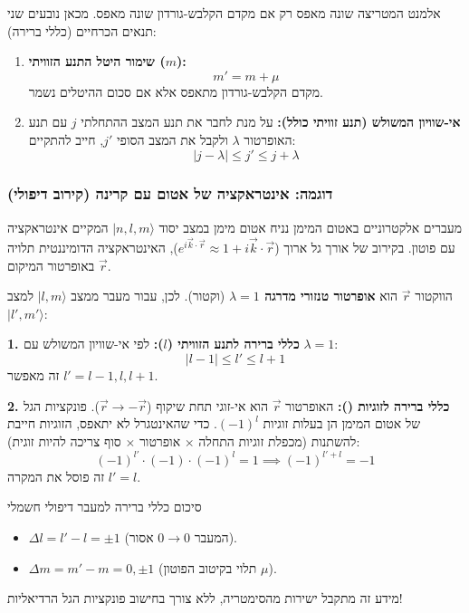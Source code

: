 אלמנט המטריצה שונה מאפס רק אם מקדם הקלבש-גורדון שונה מאפס. מכאן נובעים שני תנאים הכרחיים (כללי ברירה):

\begin{enumerate}
    \item \textbf{שימור היטל התנע הזוויתי ($m$):}
    \[
    m' = m + \mu
    \]
    מקדם הקלבש-גורדון מתאפס אלא אם סכום ההיטלים נשמר.

    \item \textbf{אי-שוויון המשולש (תנע זוויתי כולל):}
    על מנת לחבר את תנע המצב ההתחלתי $j$ עם תנע האופרטור $\lambda$ ולקבל את המצב הסופי $j'$, חייב להתקיים:
    \[
    |j - \lambda| \le j' \le j + \lambda
    \]
\end{enumerate}

\subsubsection{דוגמה: אינטראקציה של אטום עם קרינה (קירוב דיפולי)}
\begin{examplebox}{מעברים אלקטרוניים באטום המימן}
נניח אטום מימן במצב יסוד $|n, l, m\rangle$ המקיים אינטראקציה עם פוטון. בקירוב של אורך גל ארוך ($e^{i\vec{k}\cdot\vec{r}} \approx 1 + i\vec{k}\cdot\vec{r}$), האינטראקציה הדומיננטית תלויה באופרטור המיקום $\vec{r}$.

הווקטור $\vec{r}$ הוא \textbf{אופרטור טנזורי מדרגה $\lambda=1$} (וקטור).
לכן, עבור מעבר ממצב $|l, m\rangle$ למצב $|l', m'\rangle$:

\textbf{1. כללי ברירה לתנע הזוויתי ($l$):}
לפי אי-שוויון המשולש עם $\lambda=1$:
\[
|l - 1| \le l' \le l + 1
\]
זה מאפשר $l' = l-1, l, l+1$.

\textbf{2. כללי ברירה לזוגיות ():}
האופרטור $\vec{r}$ הוא אי-זוגי תחת שיקוף ($\vec{r} \to -\vec{r}$).
פונקציות הגל של אטום המימן הן בעלות זוגיות $(-1)^l$.
כדי שהאינטגרל לא יתאפס, הזוגיות חייבת להשתנות (מכפלת זוגיות התחלה $\times$ אופרטור $\times$ סוף צריכה להיות זוגית):
\[
(-1)^{l'} \cdot (-1) \cdot (-1)^l = 1 \implies (-1)^{l' + l} = -1
\]
זה פוסל את המקרה $l' = l$.
\end{examplebox}

\begin{resultbox}{סיכום כללי ברירה למעבר דיפולי חשמלי}
\begin{itemize}
    \item $\Delta l = l' - l = \pm 1$ (המעבר $0 \to 0$ אסור).
    \item $\Delta m = m' - m = 0, \pm 1$ (תלוי בקיטוב הפוטון $\mu$).
\end{itemize}
מידע זה מתקבל ישירות מהסימטריה, ללא צורך בחישוב פונקציות הגל הרדיאליות!
\end{resultbox}


